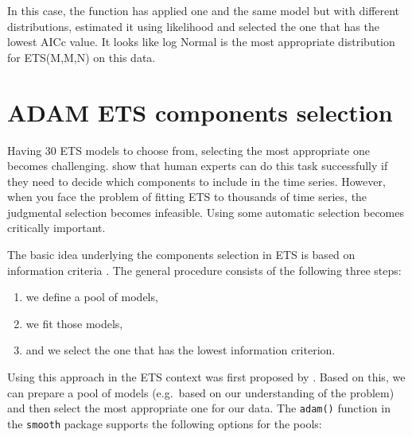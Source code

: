 \documentclass[
]{book}
\providecommand{\tightlist}{%
  \setlength{\itemsep}{0pt}\setlength{\parskip}{0pt}}
\theoremstyle{definition}
\theoremstyle{definition}
\theoremstyle{definition}
\theoremstyle{definition}
\theoremstyle{remark}
\begin{document}
In this case, the function has applied one and the same model but with different distributions, estimated it using likelihood and selected the one that has the lowest AICc value. It looks like log Normal is the most appropriate distribution for ETS(M,M,N) on this data.

\hypertarget{ETSSelection}{%
\section{ADAM ETS components selection}\label{ETSSelection}}

Having 30 ETS models to choose from, selecting the most appropriate one becomes challenging. \citet{Petropoulos2018a} show that human experts can do this task successfully if they need to decide which components to include in the time series. However, when you face the problem of fitting ETS to thousands of time series, the judgmental selection becomes infeasible. Using some automatic selection becomes critically important.

The basic idea underlying the components selection in ETS is based on information criteria \citep[Section 13.3 of][]{SvetunkovSBA}. The general procedure consists of the following three steps:

\begin{enumerate}
\def\labelenumi{\arabic{enumi}.}
\tightlist
\item
  we define a pool of models,
\item
  we fit those models,
\item
  and we select the one that has the lowest information criterion.
\end{enumerate}

Using this approach in the ETS context was first proposed by \citet{Hyndman2002}. Based on this, we can prepare a pool of models (e.g.~based on our understanding of the problem) and then select the most appropriate one for our data. The \texttt{adam()} function in the \texttt{smooth} package supports the following options for the pools:
\end{document}
